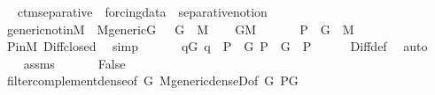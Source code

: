 \begin{isabellebody}
{\isafoldproof}%
%
\isadelimproof
\isanewline
%
\endisadelimproof
\isanewline
{}\isamarkupfalse%
\ \isanewline
\isanewline
{}\isamarkupfalse%
\ ctm{\isacharunderscore}{\kern0pt}separative\ {\isacharequal}{\kern0pt}\ forcing{\isacharunderscore}{\kern0pt}data\ {\isacharplus}{\kern0pt}\ separative{\isacharunderscore}{\kern0pt}notion\isanewline
{}\isanewline
\isanewline
{}\isamarkupfalse%
\ generic{\isacharunderscore}{\kern0pt}not{\isacharunderscore}{\kern0pt}in{\isacharunderscore}{\kern0pt}M{\isacharcolon}{\kern0pt}\ \ {\isachardoublequoteopen}M{\isacharunderscore}{\kern0pt}generic{\isacharparenleft}{\kern0pt}G{\isacharparenright}{\kern0pt}{\isachardoublequoteclose}\ \ \ {\isachardoublequoteopen}G\ {\isasymnotin}\ M{\isachardoublequoteclose}\isanewline
%
\isadelimproof
%
\endisadelimproof
%
\isatagproof
{}\isamarkupfalse%
\isanewline
\ \ \isamarkupfalse%
\ {\isachardoublequoteopen}G{\isasymin}M{\isachardoublequoteclose}\isanewline
\ \ \isamarkupfalse%
\isanewline
\ \ \isamarkupfalse%
\ {\isachardoublequoteopen}P\ {\isacharminus}{\kern0pt}\ G\ {\isasymin}\ M{\isachardoublequoteclose}\ \isanewline
\ \ \ \ \isamarkupfalse%
\ P{\isacharunderscore}{\kern0pt}in{\isacharunderscore}{\kern0pt}M\ Diff{\isacharunderscore}{\kern0pt}closed\ \isamarkupfalse%
\ simp\isanewline
\ \ \isamarkupfalse%
\isanewline
\ \ \isamarkupfalse%
\ {\isachardoublequoteopen}{\isasymnot}{\isacharparenleft}{\kern0pt}{\isasymexists}q{\isasymin}G{\isachardot}{\kern0pt}\ q\ {\isasymin}\ P\ {\isacharminus}{\kern0pt}\ G{\isacharparenright}{\kern0pt}{\isachardoublequoteclose}\ {\isachardoublequoteopen}{\isacharparenleft}{\kern0pt}P\ {\isacharminus}{\kern0pt}\ G{\isacharparenright}{\kern0pt}\ {\isasymsubseteq}\ P{\isachardoublequoteclose}\isanewline
\ \ \ \ \isamarkupfalse%
\ Diff{\isacharunderscore}{\kern0pt}def\ \isamarkupfalse%
\ auto\isanewline
\ \ \isamarkupfalse%
\isanewline
\ \ \isamarkupfalse%
\ assms\isanewline
\ \ \isamarkupfalse%
\isanewline
\ \ \isamarkupfalse%
\ {\isachardoublequoteopen}False{\isachardoublequoteclose}\isanewline
\ \ \ \ \isamarkupfalse%
\ filter{\isacharunderscore}{\kern0pt}complement{\isacharunderscore}{\kern0pt}dense{\isacharbrackleft}{\kern0pt}of\ G{\isacharbrackright}{\kern0pt}\ M{\isacharunderscore}{\kern0pt}generic{\isacharunderscore}{\kern0pt}denseD{\isacharbrackleft}{\kern0pt}of\ G\ {\isachardoublequoteopen}P{\isacharminus}{\kern0pt}G{\isachardoublequoteclose}{\isacharbrackright}{\kern0pt}\ \isanewline

\end{isabellebody}
